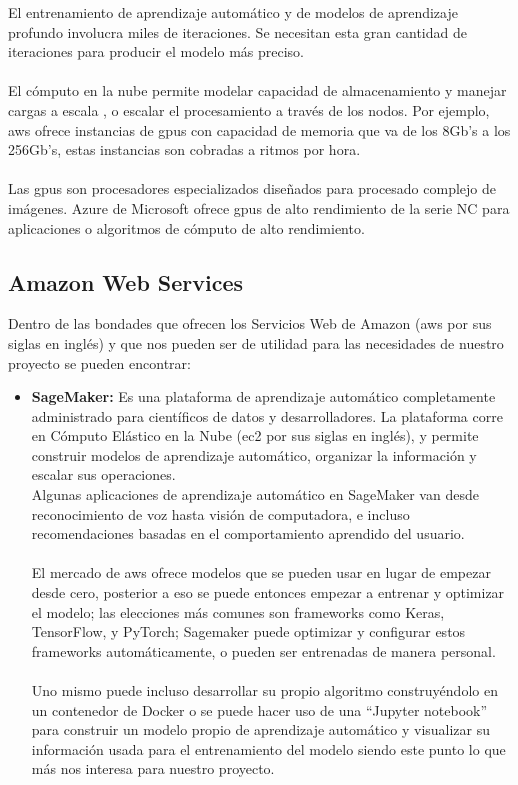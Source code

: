 \documentclass[12pt, a4paper, titlepage]{report}
\begin{document}
		El entrenamiento de aprendizaje automático y de modelos de aprendizaje profundo involucra miles de iteraciones. Se necesitan esta gran cantidad de iteraciones para producir el modelo más preciso.\\\\ 
		El cómputo en la nube permite modelar capacidad de almacenamiento y manejar cargas a escala \cite{data_science_in_the_cloud}, o escalar el procesamiento a través de los nodos. Por ejemplo, \acrshort{aws} ofrece instancias de \acrshort{gpu}s con capacidad de memoria que va de los 8Gb's a los 256Gb's, estas instancias son cobradas a ritmos por hora.\\\\
		Las \acrshort{gpu}s son procesadores especializados diseñados para procesado complejo de imágenes. Azure de Microsoft ofrece \acrshort{gpu}s de alto rendimiento de la serie NC para aplicaciones o algoritmos de cómputo de alto rendimiento.
		
				\subsection{Amazon Web Services}
				Dentro de las bondades que ofrecen los Servicios Web de Amazon (\acrfull{aws} por sus siglas en inglés) y que nos pueden ser de utilidad para las necesidades de nuestro proyecto se pueden encontrar: 
				
				\begin{itemize}
					\item \textbf{SageMaker:} Es una plataforma de aprendizaje automático completamente administrado para científicos de datos y desarrolladores. La plataforma corre en Cómputo Elástico en la Nube (\acrfull{ec2} por sus siglas en inglés), y permite construir modelos de aprendizaje automático, organizar la información y escalar sus operaciones. \\
					Algunas aplicaciones de aprendizaje automático en SageMaker van desde reconocimiento de voz hasta visión de computadora, e incluso recomendaciones basadas en el comportamiento aprendido del usuario.\\\\ 
					El mercado de \acrshort{aws} ofrece modelos que se pueden usar en lugar de empezar desde cero, posterior a eso se puede entonces empezar a entrenar y optimizar el modelo; las elecciones más comunes son frameworks como Keras, TensorFlow, y PyTorch; Sagemaker puede optimizar y configurar estos frameworks automáticamente, o pueden ser entrenadas de manera personal.\\\\ 
					\newpage
					Uno mismo puede incluso desarrollar su propio algoritmo construyéndolo en un contenedor de Docker o se puede hacer uso de una “Jupyter notebook” \cite{what_is_jupyter} para construir un modelo propio de aprendizaje automático y visualizar su información usada para el entrenamiento del modelo siendo este punto lo que más nos interesa para nuestro proyecto.
					
				\end{itemize}
		
\end{document}
